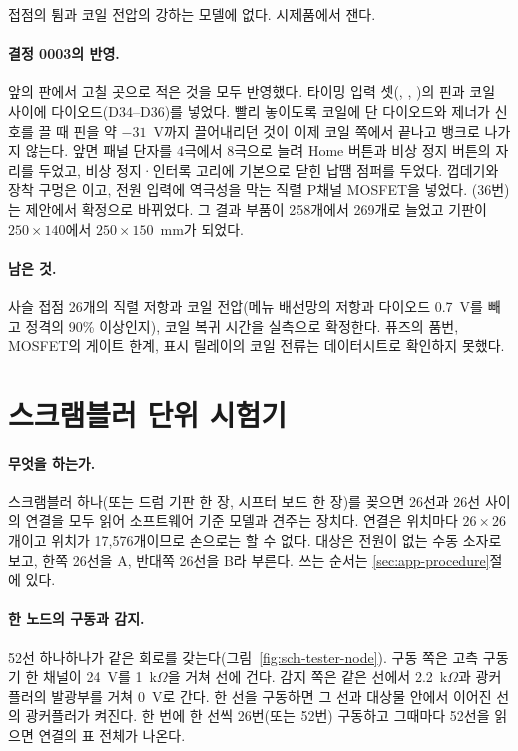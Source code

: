 접점의 튐과 코일 전압의 강하는 모델에 없다. 시제품에서 잰다.

\paragraph{결정 0003의 반영.} 앞의 판에서 고칠 곳으로 적은 것을 모두 반영했다. 타이밍 입력 셋(,
, )의 핀과 코일 사이에 다이오드(D34--D36)를 넣었다. 빨리 놓이도록 코일에 단 다이오드와
제너가 신호를 끌 때 핀을 약 $-31$~V까지 끌어내리던 것이 이제 코일 쪽에서 끝나고 뱅크로 나가지 않는다. 앞면 패널
단자를 4극에서 8극으로 늘려 Home 버튼과 비상 정지 버튼의 자리를 두었고, 비상 정지·인터록 고리에 기본으로 닫힌
납땜 점퍼를 두었다. 껍데기와 장착 구멍은 이고, 전원 입력에 역극성을 막는 직렬 P채널 MOSFET을
넣었다. (36번)는 제안에서 확정으로 바뀌었다. 그 결과 부품이 258개에서 269개로 늘었고 기판이
$250 \times 140$에서 $250 \times 150$~mm가 되었다.

\paragraph{남은 것.} 사슬 접점 26개의 직렬 저항과 코일 전압(메뉴 배선망의 저항과 다이오드 0.7~V를 빼고 정격의
90\% 이상인지), 코일 복귀 시간을 실측으로 확정한다. 퓨즈의 품번, MOSFET의 게이트 한계, 표시 릴레이의 코일 전류는
데이터시트로 확인하지 못했다.


\section{스크램블러 단위 시험기}\label{sch:unit-tester}

\paragraph{무엇을 하는가.} 스크램블러 하나(또는 드럼 기판 한 장, 시프터 보드 한 장)를 꽂으면 26선과 26선
사이의 연결을 모두 읽어 소프트웨어 기준 모델과 견주는 장치다. 연결은 위치마다 $26 \times 26$개이고 위치가
17,576개이므로 손으로는 할 수 없다. 대상은 전원이 없는 수동 소자로 보고, 한쪽 26선을 A, 반대쪽 26선을 B라
부른다. 쓰는 순서는 \ref{sec:app-procedure}절에 있다.

\paragraph{한 노드의 구동과 감지.} 52선 하나하나가 같은 회로를 갖는다(그림~\ref{fig:sch-tester-node}). 구동 쪽은
고측 구동기 한 채널이 24~V를 1~k$\Omega$을 거쳐 선에 건다. 감지 쪽은 같은 선에서 2.2~k$\Omega$과 광커플러의
발광부를 거쳐 0~V로 간다. 한 선을 구동하면 그 선과 대상물 안에서 이어진 선의 광커플러가 켜진다. 한 번에 한
선씩 26번(또는 52번) 구동하고 그때마다 52선을 읽으면 연결의 표 전체가 나온다.

